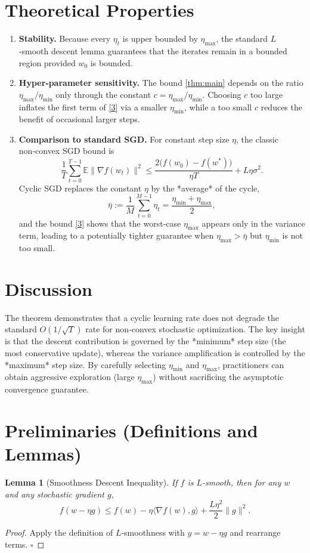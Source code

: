 \documentclass[11pt]{article}
\newtheorem{lemma}{Lemma}
\begin{document}
\section*{Theoretical Properties}
\begin{enumerate}
\item \textbf{Stability.} Because every $\eta_t$ is upper bounded by $\eta_{\max}$, the standard $L$‑smooth descent lemma guarantees that the iterates remain in a bounded region provided $w_0$ is bounded.
\item \textbf{Hyper‑parameter sensitivity.} The bound \eqref{thm:main} depends on the ratio $\eta_{\max}/\eta_{\min}$ only through the constant $c=\eta_{\max}/\eta_{\min}$. Choosing $c$ too large inflates the first term of \eqref{3} via a smaller $\eta_{\min}$, while a too small $c$ reduces the benefit of occasional larger steps.
\item \textbf{Comparison to standard SGD.} For constant step size $\eta$, the classic non‑convex SGD bound is
\[
\frac1T\sum_{t=0}^{T-1}\mathbb{E}\|\nabla f(w_t)\|^2\le
\frac{2\big(f(w_0)-f(w^*)\big)}{\eta T}+L\eta\sigma^2 .
\]
Cyclic SGD replaces the constant $\eta$ by the *average* of the cycle,
\[
\bar\eta:=\frac{1}{M}\sum_{t=0}^{M-1}\eta_t=\frac{\eta_{\min}+\eta_{\max}}{2},
\]
and the bound \eqref{3} shows that the worst‑case $\eta_{\max}$ appears only in the variance term, leading to a potentially tighter guarantee when $\eta_{\max}>\bar\eta$ but $\eta_{\min}$ is not too small.
\end{enumerate}

\section*{Discussion}
The theorem demonstrates that a cyclic learning rate does not degrade the standard $O(1/\sqrt{T})$ rate for non‑convex stochastic optimization. The key insight is that the descent contribution is governed by the *minimum* step size (the most conservative update), whereas the variance amplification is controlled by the *maximum* step size. By carefully selecting $\eta_{\min}$ and $\eta_{\max}$, practitioners can obtain aggressive exploration (large $\eta_{\max}$) without sacrificing the asymptotic convergence guarantee.

\newpage
\section*{Preliminaries (Definitions and Lemmas)}
\begin{lemma}[Smoothness Descent Inequality]\label{lem:smooth}
If $f$ is $L$‑smooth, then for any $w$ and any stochastic gradient $g$,
\[
f(w-\eta g)\le f(w)-\eta\langle\nabla f(w),g\rangle+\frac{L\eta^2}{2}\|g\|^2 .
\]
\end{lemma}
\begin{proof}
Apply the definition of $L$‑smoothness with $y=w-\eta g$ and rearrange terms. \hfill $\square$
\end{proof}
\end{document}
